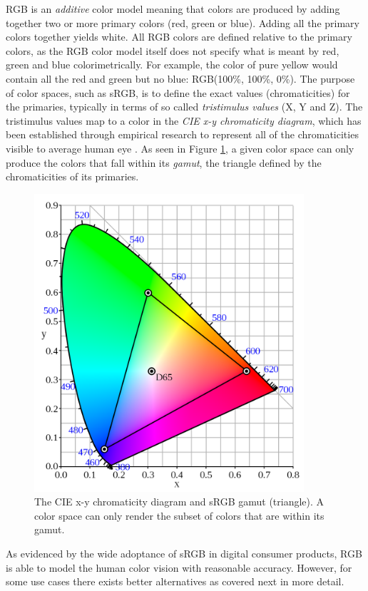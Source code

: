 \documentclass[thesis.tex]{subfiles}
\begin{document}
RGB is an \textit{additive} color model meaning that colors are produced by adding together two or more primary colors (red, green or blue). Adding all the primary colors together yields white. All RGB colors are defined relative to the primary colors, as the RGB color model itself does not specify what is meant by red, green and blue colorimetrically. For example, the color of pure yellow would contain all the red and green but no blue: RGB(100\%, 100\%, 0\%). The purpose of color spaces, such as sRGB, is to define the exact values (chromaticities) for the primaries, typically in terms of so called \textit{tristimulus values} (X, Y and Z). The tristimulus values map to a color in the \textit{CIE x-y chromaticity diagram}, which has been established through empirical research to represent all of the chromaticities visible to average human eye \cite{cie}. As seen in Figure \ref{figure:srgb}, a given color space can only produce the colors that fall within its \textit{gamut}, the triangle defined by the chromaticities of its primaries.

\begin{figure}[ht]
\centering \includegraphics[width=10cm]{images/srgb}
\caption{The CIE x-y chromaticity diagram and sRGB gamut (triangle). A color space can only render the subset of colors that are within its gamut.\label{figure:srgb}}
\end{figure}

As evidenced by the wide adoptance of sRGB in digital consumer products, RGB is able to model the human color vision with reasonable accuracy. However, for some use cases there exists better alternatives as covered next in more detail.
\end{document}
